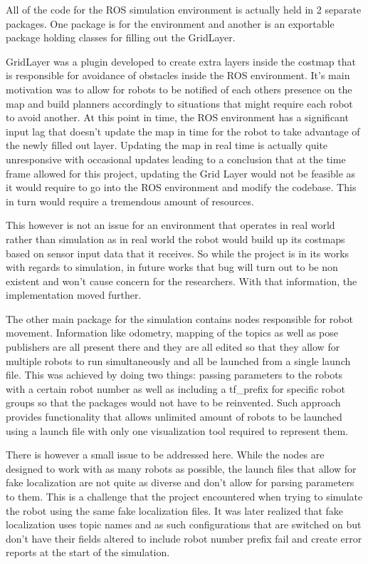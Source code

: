       All of the code for the ROS simulation environment is actually held in 2 separate packages. One package is for the environment and another is an exportable package holding classes for filling out the GridLayer.

      GridLayer was a plugin developed to create extra layers inside the costmap that is responsible for avoidance of obstacles inside the ROS environment. It's main motivation was to allow for robots to be notified of each others presence on the map and build planners accordingly to situations that might require each robot to avoid another. At this point in time, the ROS environment has a significant input lag that doesn't update the map in time for the robot to take advantage of the newly filled out layer. Updating the map in real time is actually quite unresponsive with occasional updates leading to a conclusion that at the time frame allowed for this project, updating the Grid Layer would not be feasible as it would require to go into the ROS environment and modify the codebase. This in turn would require a tremendous amount of resources.

      This however is not an issue for an environment that operates in real world rather than simulation as in real world the robot would build up its costmaps based on sensor input data that it receives. So while the project is in its works with regards to simulation, in future works that bug will turn out to be non existent and won't cause concern for the researchers. With that information, the implementation moved further.

      The other main package for the simulation contains nodes responsible for robot movement. Information like odometry, mapping of the topics as well as pose publishers are all present there and they are all edited so that they allow for multiple robots to run simultaneously and all be launched from a single launch file. This was achieved by doing two things: passing parameters to the robots with a certain robot number as well as including a tf\_prefix for specific robot groups so that the packages would not have to be reinvented. Such approach provides functionality that allows unlimited amount of robots to be launched using a launch file with only one visualization tool required to represent them.

      There is however a small issue to be addressed here. While the nodes are designed to work with as many robots as possible, the launch files that allow for fake localization are not quite as diverse and don't allow for parsing parameters to them. This is a challenge that the project encountered when trying to simulate the robot using the same fake localization files. It was later realized that fake localization uses topic names and as such configurations that are switched on but don't have their fields altered to include robot number prefix fail and create error reports at the start of the simulation.

